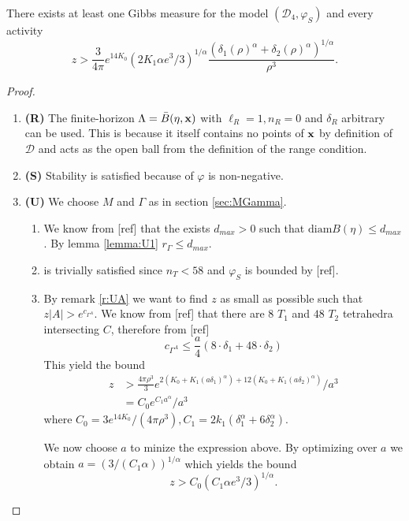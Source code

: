 \begin{proposition}\label{prop:E1}
	There exists at least one Gibbs measure for the model $(\mathcal D_4,\varphi_S)$ and every activity 
	$$z> \frac{3}{4\pi}e^{14 K_0}   (2K_1 \alpha e^3/3)^{1/\alpha} \frac{(\delta_1(\rho)^\alpha + \delta_2(\rho)^\alpha)^{1/\alpha}}{\rho^3}.$$
\end{proposition}
\begin{proof}
\begin{enumerate}[]
	\item \textbf{(R)} The finite-horizon $\Lambda = \bar B(\eta,{\mathbf{x}})$ with $\ell_R = 1, n_R = 0$ and $\delta_R$ arbitrary can be used. This is because it itself contains no points of ${\mathbf{x}}$ by definition of $\mathcal D$ and acts as the open ball from the definition of the range condition.
	\item \textbf{(S)} Stability is satisfied because of $\varphi$ is non-negative.
	\item \textbf{(U)} We choose $M$ and $\Gamma$ as in section \ref{sec:MGamma}.
		\begin{enumerate}[(U1)]
			\item We know from [ref] that the exists $d_{max}>0$ such that $\text{diam}B(\eta)\leq d_{max}$. By lemma \ref{lemma:U1} $r_\Gamma\leq d_{max}.$
			\item is trivially satisfied since $n_T < 58$ and $\varphi_S$ is bounded by [ref].
			\item By remark \ref{r:UA} we want to find $z$ as small as possible such that $z|A|>e^{c_{\Gamma^A}}.$ We know from [ref] that there are $8$ $T_1$ and $48$ $T_2$ tetrahedra intersecting $C$, therefore from [ref]
				$$c_{\Gamma^A} \leq \frac a4 (8\cdot \delta_1 + 48\cdot \delta_2 )$$
				This yield the bound
				\begin{align*}z &> \frac{4\pi\rho^3}{3} e^{2(K_0 + K_1 (a\delta_1)^\alpha) + 12(K_0 + K_1(a \delta_2)^\alpha)} / a^3  \\
					&= C_0 e^{C_1 a^\alpha} / a^3  
				\end{align*}
				where $C_0 = 3e^{14K_0}/(4\pi \rho^3),  C_1 = 2k_1(\delta_1^\alpha + 6 \delta_2^\alpha)$.

				We now choose $a$ to minize the expression above. By optimizing over $a$ we obtain $a=(3/(C_1 \alpha))^{1/\alpha}$ which yields the bound 
				$$z> C_0(C_1 \alpha e^3/ 3 )^{1/\alpha}.$$
		\end{enumerate}
\end{enumerate}
\end{proof}



